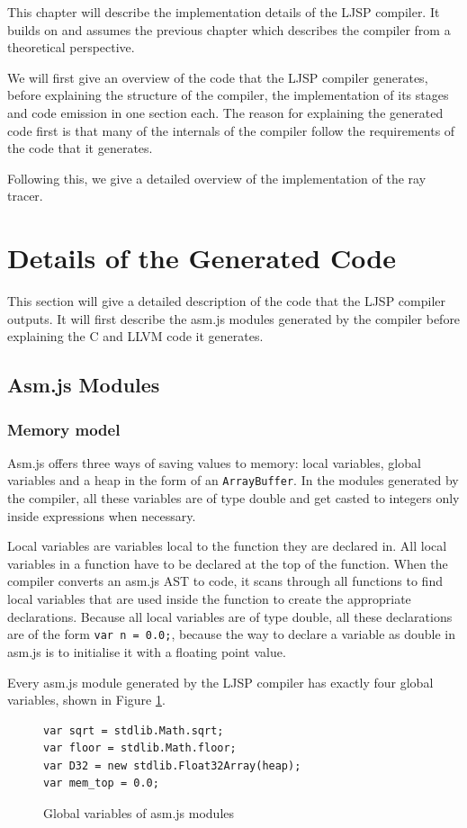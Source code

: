 \documentclass[11pt]{report}
\begin{document}
This chapter will describe the implementation details of the LJSP compiler. It builds on and assumes the previous chapter which describes the compiler from a theoretical perspective.

We will first give an overview of the code that the LJSP compiler generates, before explaining the structure of the compiler, the implementation of its stages and code emission in one section each. The reason for explaining the generated code first is that many of the internals of the compiler follow the requirements of the code that it generates. 

Following this, we give a detailed overview of the implementation of the ray tracer.

\section{Details of the Generated Code}
This section will give a detailed description of the code that the LJSP compiler outputs. It will first describe the asm.js modules generated by the compiler before explaining the C and LLVM code it generates.

\subsection{Asm.js Modules}
\subsubsection{Memory model}
Asm.js offers three ways of saving values to memory: local variables, global variables and a heap in the form of an \texttt{ArrayBuffer}. In the modules generated by the compiler, all these variables are of type double and get casted to integers only inside expressions when necessary.

Local variables are variables local to the function they are declared in. All local variables in a function have to be declared at the top of the function. When the compiler converts an asm.js AST to code, it scans through all functions to find local variables that are used inside the function to create the appropriate declarations. Because all local variables are of type double, all these declarations are of the form \texttt{var n = 0.0;}, because the way to declare a variable as double in asm.js is to initialise it with a floating point value.

Every asm.js module generated by the LJSP compiler has exactly four global variables, shown in Figure \ref{iasmjsmm1}. 
\begin{figure}[ht]
\begin{lstlisting}
var sqrt = stdlib.Math.sqrt;
var floor = stdlib.Math.floor;
var D32 = new stdlib.Float32Array(heap);
var mem_top = 0.0;
\end{lstlisting}
\caption{Global variables of asm.js modules}
\label{iasmjsmm1}
\end{figure}
\end{document}
